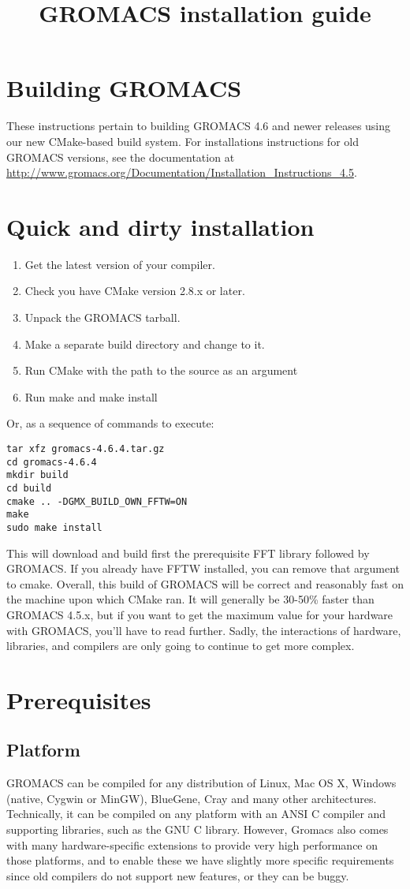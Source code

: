 \documentclass{article}[12pt,a4paper,twoside]
\title{GROMACS installation guide}
\newcommand{\gromacs}{GROMACS}
\newcommand{\cmake}{CMake}
\begin{document}
\section{Building GROMACS}

These instructions pertain to building \gromacs{} 4.6 and newer releases
using our new CMake-based build system. 
For installations instructions for old \gromacs{} versions,
see the documentation at
\url{http://www.gromacs.org/Documentation/Installation_Instructions_4.5}.

\section{Quick and dirty installation}

\begin{enumerate}
\item Get the latest version of your compiler.
\item Check you have \cmake{} version 2.8.x or later.
\item Unpack the \gromacs{} tarball.
\item Make a separate build directory and change to it. 
\item Run \cmake{} with the path to the source as an argument
\item Run make and make install
\end{enumerate}
Or, as a sequence of commands to execute:
\begin{verbatim}
tar xfz gromacs-4.6.4.tar.gz
cd gromacs-4.6.4
mkdir build
cd build
cmake .. -DGMX_BUILD_OWN_FFTW=ON
make
sudo make install
\end{verbatim}
This will download and build first the prerequisite FFT library followed by \gromacs{}. If you already have
FFTW installed, you can remove that argument to cmake. Overall, this build 
of \gromacs{} will be correct and reasonably fast on the
machine upon which \cmake{} ran. It will generally be 30-50\% faster
than \gromacs{} 4.5.x, but if you want to get the maximum value
for your hardware with \gromacs{}, you'll have to read further.
Sadly, the interactions of hardware, libraries, and compilers
are only going to continue to get more complex. 

\section{Prerequisites}
\subsection{Platform}
\gromacs{} can be compiled for any distribution of Linux, Mac OS X,
Windows (native, Cygwin or MinGW), BlueGene, Cray and many other architectures.
Technically, it can be compiled on any platform with an ANSI C
compiler and supporting libraries, such as the GNU C library. However, Gromacs
also comes with many hardware-specific extensions to provide very high performance
on those platforms, and to enable these we have slightly more specific requirements
since old compilers do not support new features, or they can be buggy.
\end{document}
